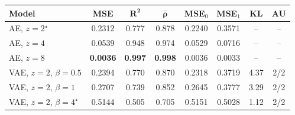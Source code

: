 \begin{tabular}{lccccccc}
\hline
\textbf{Model} & \textbf{MSE} & $\mathbf{R^2}$ & $\bar{\boldsymbol{\rho}}$ & \textbf{MSE$_0$} & \textbf{MSE$_1$} & \textbf{KL} & \textbf{AU} \\ \hline
AE, $z=2$$^\star$ & 0.2312 & 0.777 & 0.878 & 0.2240 & 0.3571 & -- & -- \\
AE, $z=4$ & 0.0539 & 0.948 & 0.974 & 0.0529 & 0.0716 & -- & -- \\
AE, $z=8$ & \textbf{0.0036} & \textbf{0.997} & \textbf{0.998} & 0.0036 & 0.0033 & -- & -- \\
\hline
VAE, $z=2$, $\beta=0.5$ & 0.2394 & 0.770 & 0.870 & 0.2318 & 0.3719 & 4.37 & 2/2 \\
VAE, $z=2$, $\beta=1$ & 0.2707 & 0.739 & 0.852 & 0.2645 & 0.3777 & 3.29 & 2/2 \\
VAE, $z=2$, $\beta=4$$^\star$ & 0.5144 & 0.505 & 0.705 & 0.5151 & 0.5028 & 1.12 & 2/2 \\
\hline
\end{tabular}
